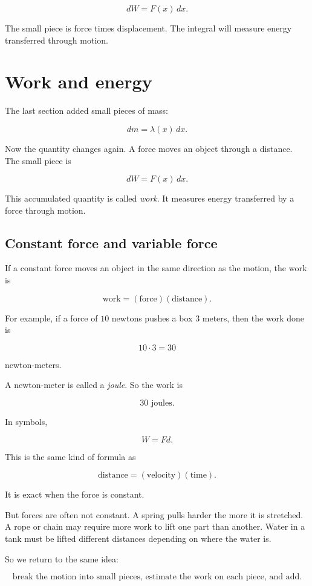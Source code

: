 \[
dW=F(x)\,dx.
\]

The small piece is force times displacement.  The integral will measure energy transferred
through motion.
\section{Work and energy}
\label{sec:work-energy}

The last section added small pieces of mass:

\[
dm=\lambda(x)\,dx.
\]

Now the quantity changes again.  A force moves an object through a distance.  The small
piece is

\[
dW=F(x)\,dx.
\]

This accumulated quantity is called \emph{work}.  It measures energy transferred by a
force through motion.

\subsection{Constant force and variable force}
\label{subsec:constant-variable-force}

If a constant force moves an object in the same direction as the motion, the work is

\[
\text{work}=(\text{force})(\text{distance}).
\]

For example, if a force of \(10\) newtons pushes a box \(3\) meters, then the work done is

\[
10\cdot 3=30
\]

newton-meters.

A newton-meter is called a \emph{joule}.  So the work is

\[
30\text{ joules}.
\]

In symbols,

\[
W=Fd.
\]

This is the same kind of formula as

\[
\text{distance}=(\text{velocity})(\text{time}).
\]

It is exact when the force is constant.

But forces are often not constant.  A spring pulls harder the more it is stretched.  A rope
or chain may require more work to lift one part than another.  Water in a tank must be
lifted different distances depending on where the water is.

So we return to the same idea:

\[
\boxed{
\text{break the motion into small pieces, estimate the work on each piece, and add.}
}
\]

